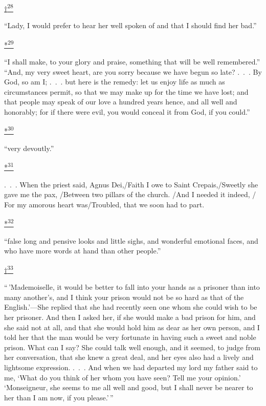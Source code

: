 \protect\hypertarget{23_NOTES.xhtmlux5cux23id_3156}{\protect\hyperlink{11_Chapter_Four__THE_FORMS_OF_LOVE.xhtmlux5cux23id_3155}{†\textsuperscript{28}}}
``Lady, I would prefer to hear her well spoken of and that I should find
her bad.''

\protect\hypertarget{23_NOTES.xhtmlux5cux23id_2312}{\protect\hyperlink{11_Chapter_Four__THE_FORMS_OF_LOVE.xhtmlux5cux23id_2311}{*\textsuperscript{29}}}
``I shall make, to your glory and praise, something that will be well
remembered.'' ``And, my very sweet heart, are you sorry because we have
begun so late? .~.~. By God, so am I; .~.~. but here is the remedy: let
us enjoy life as much as circumstances permit, so that we may make up
for the time we have lost; and that people may speak of our love a
hundred years hence, and all well and honorably; for if there were evil,
you would conceal it from God, if you could.''

\protect\hypertarget{23_NOTES.xhtmlux5cux23id_3158}{\protect\hyperlink{11_Chapter_Four__THE_FORMS_OF_LOVE.xhtmlux5cux23id_3157}{*\textsuperscript{30}}}
``very devoutly.''

\protect\hypertarget{23_NOTES.xhtmlux5cux23id_3160}{\protect\hyperlink{11_Chapter_Four__THE_FORMS_OF_LOVE.xhtmlux5cux23id_3159}{*\textsuperscript{31}}}
.~.~. When the priest said, Agnus Dei,/Faith I owe to Saint
Crepais,/Sweetly she gave me the pax, /Between two pillars of the
church. /And I needed it indeed, / For my amorous heart was/Troubled,
that we soon had to part.

\protect\hypertarget{23_NOTES.xhtmlux5cux23id_3162}{\protect\hyperlink{11_Chapter_Four__THE_FORMS_OF_LOVE.xhtmlux5cux23id_3161}{*\textsuperscript{32}}}
``false long and pensive looks and little sighs, and wonderful emotional
faces, and who have more words at hand than other people.''

\protect\hypertarget{23_NOTES.xhtmlux5cux23id_3164}{\protect\hyperlink{11_Chapter_Four__THE_FORMS_OF_LOVE.xhtmlux5cux23id_3163}{†\textsuperscript{33}}}
``\,'Mademoiselle, it would be better to fall into your hands as a
prisoner than into many another's, and I think your prison would not be
so hard as that of the English.'---She replied that she had recently
seen one whom she could wish to be her prisoner. And then I asked her,
if she would make a bad prison for him, and she said not at all, and
that she would hold him as dear as her own person, and I told her that
the man would be very fortunate in having such a sweet and noble prison.
What can I say? She could talk well enough, and it seemed, to judge from
her conversation, that she knew a great deal, and her eyes also had a
lively and lightsome expression. .~.~. And when we had departed my lord
my father said to me, `What do you think of her whom you have seen? Tell
me your opinion.' `Monseigneur, she seems to me all well and good, but I
shall never be nearer to her than I am now, if you please.'\,''

